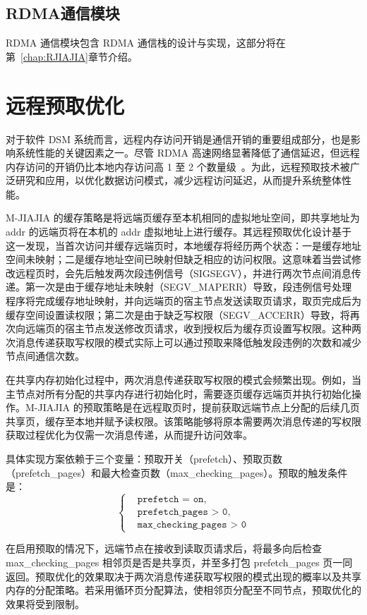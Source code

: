 {\begin{enumerate}[label=\arabic*.]
\end{enumerate}

\subsection{RDMA通信模块}
RDMA 通信模块包含 RDMA 通信栈的设计与实现，这部分将在第~\ref{chap:RJIAJIA}章节介绍。

\section{远程预取优化}
对于软件 DSM 系统而言，远程内存访问开销是通信开销的重要组成部分，也是影响系统性能的关键因素之一。尽管 RDMA 高速网络显著降低了通信延迟，但远程内存访问的开销仍比本地内存访问高 1 至 2 个数量级~\citep{cai2018gam}。为此，远程预取技术被广泛研究和应用，以优化数据访问模式，减少远程访问延迟，从而提升系统整体性能。

M-JIAJIA 的缓存策略是将远端页缓存至本机相同的虚拟地址空间，即共享地址为 addr 的远端页将在本机的 addr 虚拟地址上进行缓存。其远程预取优化设计基于这一发现，当首次访问并缓存远端页时，本地缓存将经历两个状态：一是缓存地址空间未映射；二是缓存地址空间已映射但缺乏相应的访问权限。这意味着当尝试修改远程页时，会先后触发两次段违例信号（SIGSEGV），并进行两次节点间消息传递。第一次是由于缓存地址未映射（SEGV\_MAPERR）导致，段违例信号处理程序将完成缓存地址映射，并向远端页的宿主节点发送读取页请求，取页完成后为缓存空间设置读权限；第二次是由于缺乏写权限（SEGV\_ACCERR）导致，将再次向远端页的宿主节点发送修改页请求，收到授权后为缓存页设置写权限。这种两次消息传递获取写权限的模式实际上可以通过预取来降低触发段违例的次数和减少节点间通信次数。

在共享内存初始化过程中，两次消息传递获取写权限的模式会频繁出现。例如，当主节点对所有分配的共享内存进行初始化时，需要逐页缓存远端页并执行初始化操作。M-JIAJIA 的预取策略是在远程取页时，提前获取远端节点上分配的后续几页共享页，缓存至本地并赋予读权限。该策略能够将原本需要两次消息传递的写权限获取过程优化为仅需一次消息传递，从而提升访问效率。

具体实现方案依赖于三个变量：预取开关（prefetch）、预取页数（prefetch\_pages）和最大检查页数（max\_checking\_pages）。预取的触发条件是：
$$
\left\{
\begin{aligned}
    &\texttt{prefetch = on}, \\
    &\texttt{prefetch\_pages > 0}, \\
    &\texttt{max\_checking\_pages > 0}
\end{aligned}
\right.
$$

在启用预取的情况下，远端节点在接收到读取页请求后，将最多向后检查 max\_checking\_pages 相邻页是否是共享页，并至多打包 prefetch\_pages 页一同返回。预取优化的效果取决于两次消息传递获取写权限的模式出现的概率以及共享内存的分配策略。若采用循环页分配算法，使相邻页分配至不同节点，预取优化的效果将受到限制。


}

